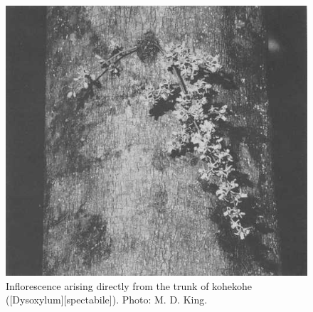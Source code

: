 \begin{figure}[htb]
	\centering
	\begin{minipage}[t]{0.61\textwidth}
		\centering
		\includegraphics[width=\textwidth]{graphics/figure16infloresence.jpg}
    	\caption[Inflorescence arising directly from the trunk of kohekohe]{Inflorescence arising directly from the trunk of kohekohe ([Dysoxylum][spectabile]).
    	Photo:  M. D. King.}%
    	\label{fig:16infloresence}
	\end{minipage}\hfill%
	\begin{minipage}[t]{0.37\textwidth}
    	\centering

\end{minipage}
\end{figure}
